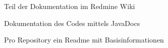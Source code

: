 \begin{frame}

\begin{block}{}
	Teil der Dokumentation im Redmine Wiki
\end{block}
\begin{block}{}
	Dokumentation des Codes mittels JavaDocs
\end{block}
\begin{block}{}
	Pro Repository ein Readme mit Basisinformationen
\end{block}
\end{frame}